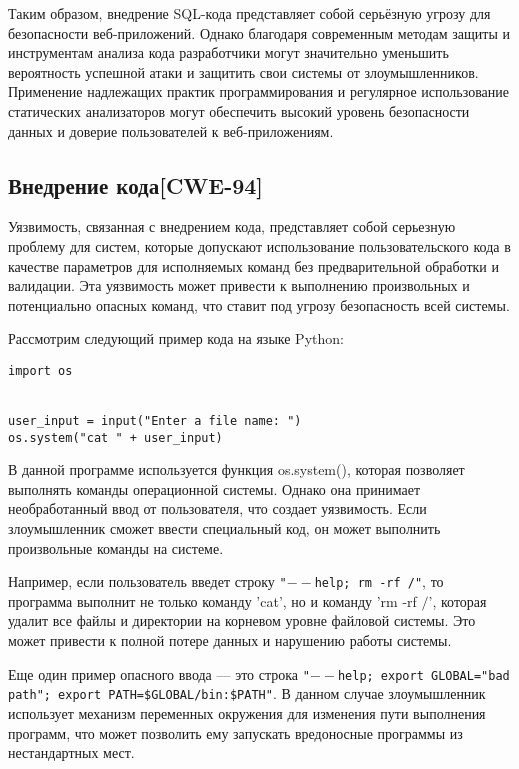 \documentclass[a4paper,12pt]{article} %
\begin{document}
			\par Таким образом, внедрение SQL-кода представляет собой серьёзную угрозу для безопасности веб-приложений. Однако благодаря современным методам защиты и инструментам анализа кода разработчики могут значительно уменьшить вероятность успешной атаки и защитить свои системы от злоумышленников. Применение надлежащих практик программирования и регулярное использование статических анализаторов могут обеспечить высокий уровень безопасности данных и доверие пользователей к веб-приложениям.

		\subsection{Внедрение кода[CWE-94]}
			Уязвимость, связанная с внедрением кода, представляет собой серьезную проблему для систем, которые допускают использование пользовательского кода в качестве параметров для исполняемых команд без предварительной обработки и валидации. Эта уязвимость может привести к выполнению произвольных и потенциально опасных команд, что ставит под угрозу безопасность всей системы.

			\par Рассмотрим следующий пример кода на языке Python:

			\begin{lstlisting}[style=pythonstyle]
import os


user_input = input("Enter a file name: ")
os.system("cat " + user_input)
        	\end{lstlisting}

			\par В данной программе используется функция os.system(), которая позволяет выполнять команды операционной системы. Однако она принимает необработанный ввод от пользователя, что создает уязвимость. Если злоумышленник сможет ввести специальный код, он может выполнить произвольные команды на системе.

			\par Например, если пользователь введет строку \texttt{"$--$help; rm -rf /"}, то программа выполнит не только команду 'cat', но и команду 'rm -rf $/$', которая удалит все файлы и директории на корневом уровне файловой системы. Это может привести к полной потере данных и нарушению работы системы.

			\par Еще один пример опасного ввода — это строка \texttt{"$--$help; export GLOBAL="bad path"; export PATH=\$GLOBAL/bin:\$PATH"}. В данном случае злоумышленник использует механизм переменных окружения для изменения пути выполнения программ, что может позволить ему запускать вредоносные программы из нестандартных мест.
\end{document}
